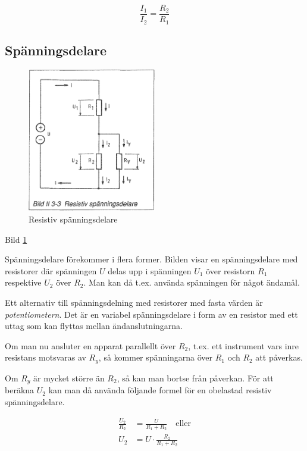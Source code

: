 \[\frac{I_1}{I_2} = \frac{R_2}{R_1}\]

\subsection{Spänningsdelare}

\begin{figure}
\includegraphics[width=0.5\textwidth]{images/bild_2_3-03}
\caption{Resistiv spänningsdelare}
\label{fig:BildII3-03}
\end{figure}

Bild \ref{fig:BildII3-03}

Spänningsdelare förekommer i flera former. Bilden visar en spänningsdelare med
resistorer där spänningen \(U\) delas upp i spänningen \(U_1\) över resistorn
\(R_1\) respektive \(U_2\) över \(R_2\). Man kan då t.ex. använda spänningen för
något ändamål.

Ett alternativ till spänningsdelning med resistorer med fasta värden är
\emph{potentiometern}. Det är en variabel spänningsdelare i form av en resistor
med ett uttag som kan flyttas mellan ändanslutningarna.

Om man nu ansluter en apparat parallellt över \(R_2\), t.ex. ett instrument
vars inre resistans motsvaras av \(R_y\), så kommer spänningarna över \(R_1\)
och \(R_2\) att påverkas.

Om \(R_y\) är mycket större än \(R_2\), så kan man bortse från påverkan.
För att beräkna \(U_2\) kan man då använda följande formel för en obelastad
resistiv spänningsdelare.

\begin{align*}
\frac{U_2}{R_2} &= \frac{U}{R_1 + R_2} \quad \text{eller} \\
U_2 &= U \cdot \frac{R_2}{R_1 + R_2}
\end{align*}

